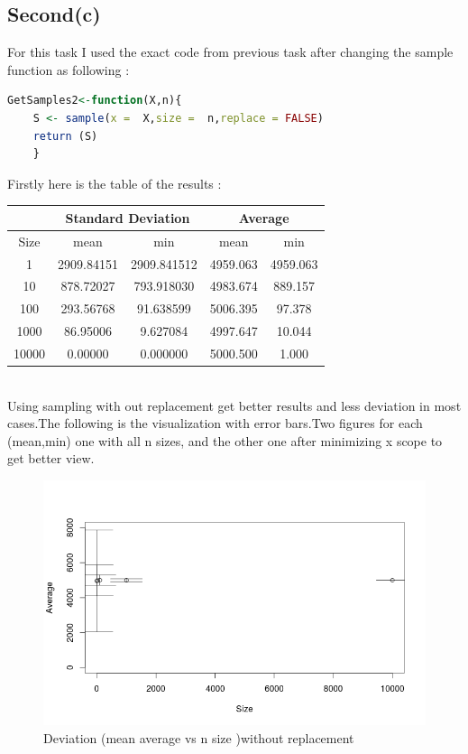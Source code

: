 \documentclass{article}
\begin{document}
	\subsection*{Second(c)}
	For this task I used the exact code from previous task after changing the sample function as following : 
	\begin{lstlisting}[language=R]
	GetSamples2<-function(X,n){
	S <- sample(x =  X,size =  n,replace = FALSE)
	return (S)
	}
	\end{lstlisting}
	Firstly here is the table of the results : \\
	\begin{tabular}{|c|c|c|c|c|}
		\hline
		&\multicolumn{2}{c|}{Standard Deviation }&\multicolumn{2}{c|}{Average}\\
		\hline
		Size&mean&min&mean&min\\
		\hline
		1&2909.84151&2909.841512&4959.063&4959.063\\
		\hline
		10&878.72027&793.918030&4983.674&889.157 \\
		\hline
		100&293.56768&91.638599&5006.395&97.378\\
		\hline
		1000&86.95006&9.627084&4997.647&10.044\\
		\hline
		10000&0.00000&0.000000&5000.500&1.000\\
		\hline 
	\end{tabular}\\
	Using sampling with out replacement get better results and less deviation in most cases.The following is the visualization with error bars.Two figures for each (mean,min) one with all n sizes, and the other one after minimizing x scope to get better view.\\
	
	\begin{figure}[H]
		\begin{center} 	
			\includegraphics[scale=0.7]{plotmeanallno.png}
		\end{center}
		\caption{Deviation (mean average vs n size )without replacement}
	\end{figure}
	
\end{document}

